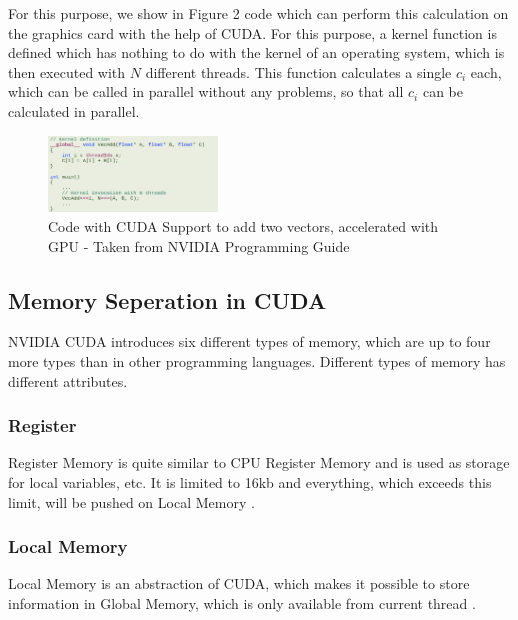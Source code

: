 \documentclass[conference]{IEEEtran}
\begin{document}
		For this purpose, we show in Figure 2 code which can perform this calculation on the graphics card with the help of CUDA. For this purpose, a kernel function is defined which has nothing to do with the kernel of an operating system, which is then executed with $N$ different threads. This function calculates a single $c_i$ each, which can be called in parallel without any problems, so that all $c_i$ can be calculated in parallel.

		\begin{figure}[htbp]
			\centerline{\includegraphics[width=0.4\textwidth]{CudaCode.png}}
			\caption{Code with CUDA Support to add two vectors, accelerated with GPU - Taken from NVIDIA Programming Guide}
			\label{fig}
		\end{figure}
	
		
	
	\subsection{Memory Seperation in CUDA}
	
	
		NVIDIA CUDA introduces six different types of memory, which are up to four more types than in other programming languages. Different types of memory has different attributes.

		\subsubsection{Register}
			Register Memory is quite similar to CPU Register Memory and is used as storage for local variables, etc. It is limited to 16kb and everything, which exceeds this limit, will be pushed on Local Memory \cite{bakkum2010accelerating}.
		\subsubsection{Local Memory}
			Local Memory is an abstraction of CUDA, which makes it possible to store information in Global Memory, which is only available from current thread \cite{bakkum2010accelerating}.
\end{document}
